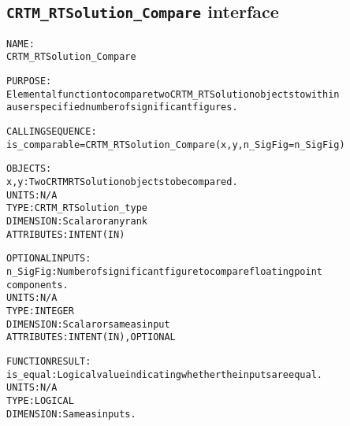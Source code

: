 \subsection{\texttt{CRTM\_RTSolution\_Compare} interface}
  \label{sec:CRTM_RTSolution_Compare_interface}
  \begin{alltt}
  NAME:
        CRTM_RTSolution_Compare
 
  PURPOSE:
        Elemental function to compare two CRTM_RTSolution objects to within
        a user specified number of significant figures.
 
  CALLING SEQUENCE:
        is_comparable = CRTM_RTSolution_Compare( x, y, n_SigFig=n_SigFig )
 
  OBJECTS:
        x, y:          Two CRTM RTSolution objects to be compared.
                       UNITS:      N/A
                       TYPE:       CRTM_RTSolution_type
                       DIMENSION:  Scalar or any rank
                       ATTRIBUTES: INTENT(IN)
 
  OPTIONAL INPUTS:
        n_SigFig:      Number of significant figure to compare floating point
                       components.
                       UNITS:      N/A
                       TYPE:       INTEGER
                       DIMENSION:  Scalar or same as input
                       ATTRIBUTES: INTENT(IN), OPTIONAL
 
  FUNCTION RESULT:
        is_equal:      Logical value indicating whether the inputs are equal.
                       UNITS:      N/A
                       TYPE:       LOGICAL
                       DIMENSION:  Same as inputs.
  \end{alltt}
